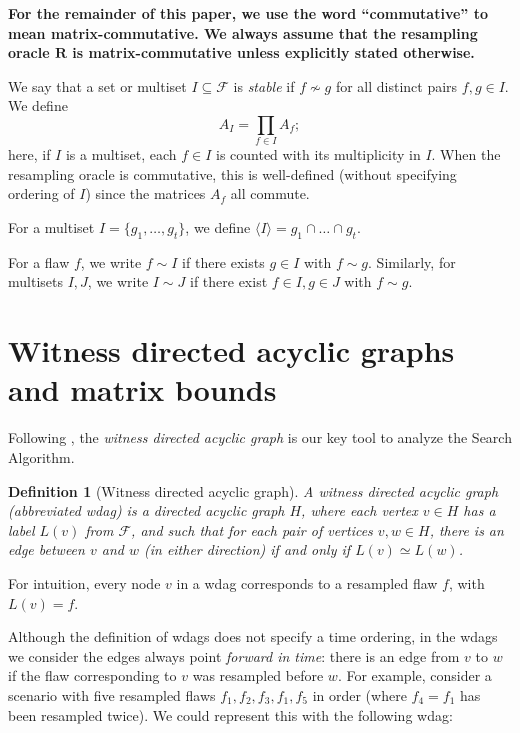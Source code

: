 \documentclass[11pt]{article}
\newtheorem{definition}[theorem]{Definition}
\begin{document}
\textbf{For the remainder of this paper, we use the word ``commutative'' to mean matrix-commutative. We always assume that the resampling oracle $\mathbf R$ is matrix-commutative unless explicitly stated otherwise.}

\bigskip



We say that a set or multiset $I \subseteq \mathcal F$ is \emph{stable} if $f \not \sim g$ for all distinct pairs $f, g \in I$. We define
$$
A_I = \prod_{f \in I} A_f;
$$
here, if $I$ is a multiset, each $f \in I$ is counted  with its multiplicity in $I$. When the resampling oracle is commutative, this is well-defined (without specifying ordering of $I$) since the matrices $A_f$ all commute.

For a
%
 multiset $I = \{g_1, \dots, g_t \}$, we define $\langle I \rangle = g_1 \cap \dots \cap g_t$.  %
%
%

For a flaw $f$, we write $f \sim I$ if there exists
%
$g \in I$ with $f \sim g$. Similarly, for 
%
 multisets $I, J$, we write $I \sim J$ if there exist $f \in I, g \in J$ with $f \sim g$.

\section{Witness directed acyclic graphs and matrix bounds}\label{WitnessTree-sec}

Following \cite{ParallelHarrisHaeupler}, the  \emph{witness directed acyclic graph}
is our key tool to analyze the Search Algorithm.
\begin{definition}[Witness directed acyclic graph]
  A  \emph{witness directed acyclic graph} (abbreviated \emph{wdag}) is a directed acyclic graph $H$, where each vertex $v \in H$ %
  has a label $L(v)$ from $\mathcal F$, and such that
%
for each pair  %
of vertices $v, w \in H$, there is an edge between $v$ and $w$ (in either direction) if and only if $L(v) \simeq L(w)$.  
\end{definition}

%

  For intuition, every node $v$ in a wdag corresponds to a resampled flaw $f$, with $L(v) = f$. 
  
  Although the definition of wdags does not specify a time ordering, in the wdags we consider the edges always point %
   \emph{forward in time}: there is an edge from $v$ to $w$ if the flaw corresponding to $v$ was resampled before $w$. For example, consider a scenario with five resampled flaws $f_1, f_2, f_3, f_1, f_5$ in order (where $f_4 = f_1$ has been resampled twice). We could represent this with the following wdag:
\end{document}

